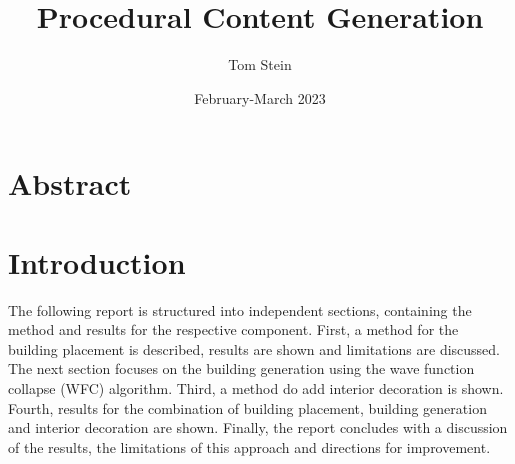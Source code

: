 \documentclass[
oneside,
fontsize=11pt
]{scrartcl}
\title{Procedural Content Generation}
\author{Tom Stein}
\date{February-March 2023}
\begin{document}


%






\newpage

 


\section*{Abstract}


\section{Introduction}


The following report is structured into independent sections, 
containing the method and results for the respective component.
First, a method for the building placement is described, results are shown and limitations are discussed.
The next section focuses on the building generation 
using the wave function collapse (WFC) algorithm. %
Third, a method do add interior decoration is shown.
Fourth, results for the combination of building placement, building generation and interior decoration are shown.
Finally, the report concludes with a discussion of the results, the limitations of this approach and 
directions for improvement.
\end{document}

